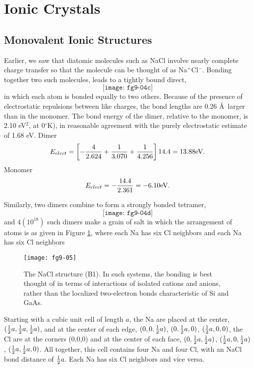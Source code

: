 \section{Ionic Crystals}

\subsection{Monovalent Ionic Structures}

Earlier, we saw that diatomic molecules such as NaCl involve nearly 
complete charge transfer so that the molecule can be thought of as 
Na$^+$Cl$^-$.  Bonding together two such
molecules, leads to a tightly bound direct,
\begin{equation}
\texttt{[image: fg9-04c]}
\label{chap9-eqno12}
\end{equation}
in which each atom is bonded equally to two others.  Because of the presence 
of electrostatic repulsions between like charges, the bond lengths are 
0.26 \AA\ larger than in the monomer. The bond energy of the dimer, relative 
to the monomer, is 2.10 eV$^2$, at 0$^{\circ}$K), in reasonable
agreement with the purely electrostatic estimate of 1.68 eV. Dimer
$$
E_{elect} = \left[ - {4 \over 2.624} + {1 \over 3.070} + {1 \over 
4.256} \right] 14.4 = 13.88 {\rm eV}.
$$
Monomer
$$
E_{elect} = - {14.4 \over 2.361} = - 6.10 {\rm eV}.
$$

Similarly, two dimers combine to form a strongly bonded tetramer,
\begin{equation}
\texttt{[image: fg9-04d]}
\label{chap9-eqno13}
\end{equation}
and $4(10^{18})$ such dimers make a grain of salt in which the
arrangement of atoms is as given in Figure \ref{chap9-fig5}, where
each Na has six Cl neighbors and each Na has six Cl neighbors

\begin{figure}
\texttt{[image: fg9-05]}
\caption{The NaCl structure (B1). In such systems, the bonding is best
thought of in terms of interactions of isolated cations and anions,
rather than the localized two-electron bonds characteristic of Si and
GaAs.}
\label{chap9-fig5}
\end{figure}


Starting with a cubic unit cell of length $a$, the Na
are placed at the center, $({1 \over 2}a, {1 \over 2} a, {1 \over 
2}a)$, and at the center of each edge, $(0 , 0 , {1 \over 2}a)$, 
$(0 , {1 \over 2}a , 0)$, $({1 \over 2} a , 0 , 0)$, 
the Cl are at the corners (0,0,0) and at the center of each face, $( 
0 , {1 \over 2}a , {1 \over 2} a)$, $({1 \over 2} a , 0 , {1 \over 2} 
a)$, $({1 \over 2} a , {1 \over 2} a , 0)$.  All together, this cell 
contains four Na and four Cl, with an NaCl bond
distance of ${1 \over 2}a$.  Each Na has six Cl neighbors and vice versa.

